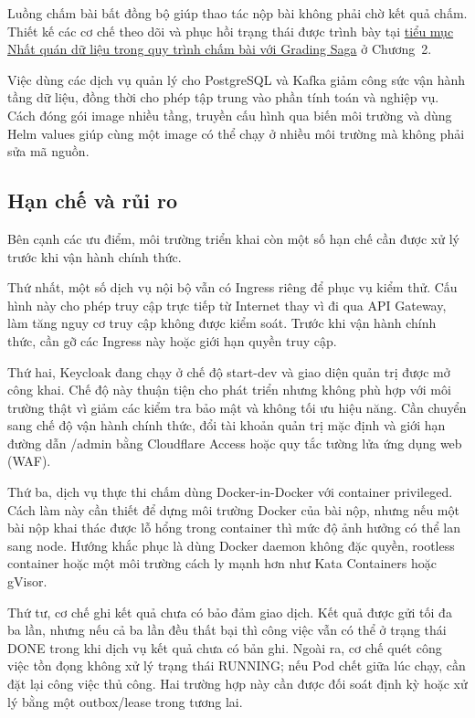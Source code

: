 \documentclass[../BTL.tex]{subfiles}
\begin{document}
Luồng chấm bài bất đồng bộ giúp thao tác nộp bài không phải chờ kết quả chấm. Thiết kế các cơ chế theo dõi và phục hồi trạng thái được trình bày tại \hyperref[sec:grading-saga]{tiểu mục Nhất quán dữ liệu trong quy trình chấm bài với Grading Saga} ở Chương~2.

Việc dùng các dịch vụ quản lý cho PostgreSQL và Kafka giảm công sức vận hành tầng dữ liệu, đồng thời cho phép tập trung vào phần tính toán và nghiệp vụ. Cách đóng gói image nhiều tầng, truyền cấu hình qua biến môi trường và dùng Helm values giúp cùng một image có thể chạy ở nhiều môi trường mà không phải sửa mã nguồn.

\subsection{Hạn chế và rủi ro}
\label{section:3.2.4}

Bên cạnh các ưu điểm, môi trường triển khai còn một số hạn chế cần được xử lý trước khi vận hành chính thức.

Thứ nhất, một số dịch vụ nội bộ vẫn có Ingress riêng để phục vụ kiểm thử. Cấu hình này cho phép truy cập trực tiếp từ Internet thay vì đi qua API Gateway, làm tăng nguy cơ truy cập không được kiểm soát. Trước khi vận hành chính thức, cần gỡ các Ingress này hoặc giới hạn quyền truy cập.

Thứ hai, Keycloak đang chạy ở chế độ start-dev và giao diện quản trị được mở công khai. Chế độ này thuận tiện cho phát triển nhưng không phù hợp với môi trường thật vì giảm các kiểm tra bảo mật và không tối ưu hiệu năng. Cần chuyển sang chế độ vận hành chính thức, đổi tài khoản quản trị mặc định và giới hạn đường dẫn /admin bằng Cloudflare Access hoặc quy tắc tường lửa ứng dụng web (WAF).

Thứ ba, dịch vụ thực thi chấm dùng Docker-in-Docker với container privileged. Cách làm này cần thiết để dựng môi trường Docker của bài nộp, nhưng nếu một bài nộp khai thác được lỗ hổng trong container thì mức độ ảnh hưởng có thể lan sang node. Hướng khắc phục là dùng Docker daemon không đặc quyền, rootless container hoặc một môi trường cách ly mạnh hơn như Kata Containers hoặc gVisor.

Thứ tư, cơ chế ghi kết quả chưa có bảo đảm giao dịch. Kết quả được gửi tối đa ba lần, nhưng nếu cả ba lần đều thất bại thì công việc vẫn có thể ở trạng thái DONE trong khi dịch vụ kết quả chưa có bản ghi. Ngoài ra, cơ chế quét công việc tồn đọng không xử lý trạng thái RUNNING; nếu Pod chết giữa lúc chạy, cần đặt lại công việc thủ công. Hai trường hợp này cần được đối soát định kỳ hoặc xử lý bằng một outbox/lease trong tương lai.
\end{document}
